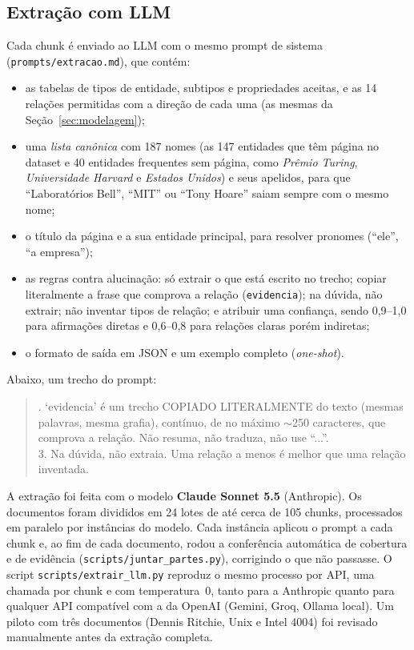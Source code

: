 \subsection{Extração com LLM}

Cada chunk é enviado ao LLM com o mesmo prompt de sistema (\texttt{prompts/extracao.md}), que contém:
\begin{itemize}
  \item as tabelas de tipos de entidade, subtipos e propriedades aceitas, e as 14 relações permitidas com a direção de cada uma (as mesmas da Seção~\ref{sec:modelagem});
  \item uma \emph{lista canônica} com 187 nomes (as 147 entidades que têm página no dataset e 40 entidades frequentes sem página, como \emph{Prêmio Turing}, \emph{Universidade Harvard} e \emph{Estados Unidos}) e seus apelidos, para que ``Laboratórios Bell'', ``MIT'' ou ``Tony Hoare'' saiam sempre com o mesmo nome;
  \item o título da página e a sua entidade principal, para resolver pronomes (``ele'', ``a empresa'');
  \item as regras contra alucinação: só extrair o que está escrito no trecho; copiar literalmente a frase que comprova a relação (\texttt{evidencia}); na dúvida, não extrair; não inventar tipos de relação; e atribuir uma confiança, sendo 0,9--1,0 para afirmações diretas e 0,6--0,8 para relações claras porém indiretas;
  \item o formato de saída em JSON e um exemplo completo (\emph{one-shot}).
\end{itemize}

Abaixo, um trecho do prompt:

\begin{quote}\small{}. `evidencia' é um trecho COPIADO LITERALMENTE do texto (mesmas palavras, mesma grafia), contínuo, de no máximo $\sim$250 caracteres, que comprova a relação. Não resuma, não traduza, não use ``...''.\\
3. Na dúvida, não extraia. Uma relação a menos é melhor que uma relação inventada.
\end{quote}

A extração foi feita com o modelo \textbf{Claude Sonnet 5.5} (Anthropic). Os documentos foram divididos em 24 lotes de até cerca de 105 chunks, processados em paralelo por instâncias do modelo. Cada instância aplicou o prompt a cada chunk e, ao fim de cada documento, rodou a conferência automática de cobertura e de evidência (\texttt{scripts/juntar\_partes.py}), corrigindo o que não passasse. O script \texttt{scripts/extrair\_llm.py} reproduz o mesmo processo por API, uma chamada por chunk e com temperatura~0, tanto para a Anthropic quanto para qualquer API compatível com a da OpenAI (Gemini, Groq, Ollama local). Um piloto com três documentos (Dennis Ritchie, Unix e Intel 4004) foi revisado manualmente antes da extração completa.

